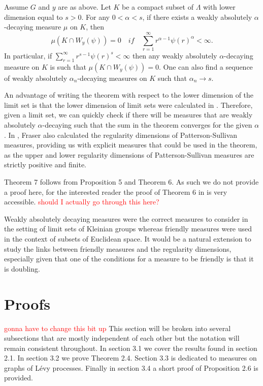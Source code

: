 \begin{theorem}
	Assume $G$ and $y$ are as above. Let $K$ be a compact subset of $\Lambda$ with lower dimension equal to $s > 0$. For any $0 < \alpha < s$, if there exists a weakly absolutely $\alpha$-decaying measure $\mu$ on $K$, then
	\[
	\mu(K\cap W_y(\psi)) = 0 \quad if \quad \sum_{r=1}^\infty r^{\alpha-1} \psi(r)^{\alpha} < \infty.
	\]
	In particular, if  $\sum_{r=1}^\infty r^{s-1} \psi(r)^{s} < \infty$ then any weakly absolutely $\alpha$-decaying measure on $K$ is such that $\mu(K\cap W_y(\psi)) = 0$. One can also find a sequence of weakly absolutely $\alpha_n$-decaying measures on $K$ such that $\alpha_n \rightarrow s$. 
\end{theorem}

An advantage of writing the theorem with respect to the lower dimension of the limit set is that the lower dimension of limit sets were calculated in \cite{fraser2}. Therefore, given a limit set, we can quickly check if there will be measures that are weakly absolutely $\alpha$-decaying such that the sum in the theorem converges for the given $\alpha$. In \cite{fraser2}, Fraser also calculated the regularity dimensions of Patterson-Sullivan measures, providing us with explicit measures that could be used in the theorem, as the upper and lower regularity dimensions of Patterson-Sullivan measures are strictly positive and finite. 

Theorem 7 follows from Proposition 5 and Theorem 6. As such we do not provide a proof here, for the interested reader the proof of Theorem 6 in \cite{beres-sanju-al} is very accessible.
\textcolor{red}{should I actually go through this here?}

Weakly absolutely decaying measures were the correct measures to consider in the setting of limit sets of Kleinian groups whereas friendly measures were used in the context of subsets of Euclidean space. It would be a natural extension to study the links between friendly measures and the regularity dimensions, especially given that one of the conditions for a measure to be friendly is that it is doubling.  



\section{Proofs}

\textcolor{red}{gonna have to change this bit up}
This section will be broken into several subsections that are mostly independent of each other but the notation will remain consistent throughout. In section 3.1 we cover the results found in section 2.1. In section 3.2 we prove Theorem 2.4. Section 3.3 is dedicated to measures on graphs of L\'evy processes. Finally in section 3.4 a short proof of Proposition 2.6 is provided.



